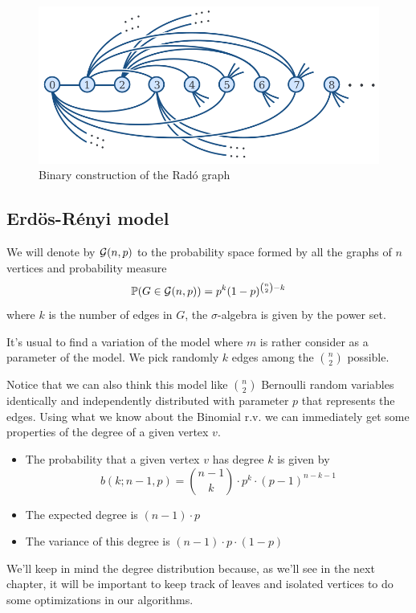 \begin{figure}[h!]
	\centering
	\includegraphics[scale=0.7]{Figures/Rado-graph.png}
	\caption{Binary construction of the Radó graph}
\end{figure}

\subsection{Erdös-Rényi model}
\begin{defini}
We will denote by $\mathcal{G}(n,p)$ to the probability space formed by all the graphs of $n$ vertices and probability measure 
$$ \mathbb{P}(G\in \mathcal{G}(n,p)) = p^{k} (1-p)^{\binom{n}{2}-k} $$
where $k$ is the number of edges in $G$, the $\sigma$-algebra is given by the power set.
\end{defini}

It's usual to find a variation of the model where $m$ is rather consider as a parameter of the model. We pick randomly $k$ edges among the $\binom{n}{2}$ possible. 

Notice that we can also think this model like $\binom{n}{2}$ Bernoulli random variables identically and independently distributed with parameter $p$ that represents the edges. Using what we know about the Binomial r.v. we can immediately get some properties of the degree of a given vertex $v$. 

\begin{itemize}
\item The probability that a given vertex $v$ has degree $k$ is given by
$$b(k; n-1,p) = \binom{n-1}{k} \cdot p^{k} \cdot (p-1)^{n-k-1}$$
\item The expected degree is $(n-1)\cdot p$
\item The variance of this degree is $(n-1)\cdot p \cdot (1-p)$
\end{itemize}

We'll keep in mind the degree distribution because, as we'll see in the next chapter, it will be important to keep track of leaves and isolated vertices to do some optimizations in our algorithms.

